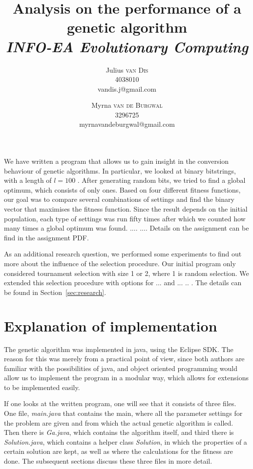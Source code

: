 \documentclass[10pt,a4paper,onecolumn]{article}
\title{Analysis on the performance of a genetic algorithm\\ \textit{INFO-EA Evolutionary Computing}}
\author{Julius \textsc{van Dis} \\ 4038010 \\vandis.j@gmail.com
\and Myrna \textsc{van de Burgwal} \\ 3296725 \\myrnavandeburgwal@gmail.com}
\begin{document}
\maketitle
\thispagestyle{empty}
%
\section*{}
We have written a program that allows us to gain insight in the conversion behaviour of genetic algorithms. In particular, we looked at binary bitstrings, with a length of $l=100$ . After generating random bits, we tried to find a global optimum, which consists of only ones. Based on four different fitness functions, our goal was to compare several combinations of settings and find the binary vector that maximises the fitness function. Since the result depends on the initial population, each type of settings was run fifty times after which we counted how many times a global optimum was found.
....
....
Details on the assignment can be find in the assignment PDF.

As an additional research question, we performed some experiments to find out more about the influence of the selection procedure. Our initial program only considered tournament selection with size 1 or 2, where 1 is random selection. We extended this selection procedure with options for ... and  ... .. . The details can be found in Section~\ref{sec:research}.

\section{Explanation of implementation}
The genetic algorithm was implemented in java, using the Eclipse SDK. The reason for this was merely from a practical point of view, since both authors are familiar with the possibilities of java, and object oriented programming would allow us to implement the program in a modular way, which allows for extensions to be implemented easily.

If one looks at the written program, one will see that it consists of three files. One file, \textit{main.java} that contains the main, where all the parameter settings for the problem are given and from which the actual genetic algorithm is called. Then there is \textit{Ga.java}, which contains the algorithm itself, and third there is \textit{Solution.java}, which contains a helper class \textit{Solution}, in which the properties of a certain solution are kept, as well as where the calculations for the fitness are done. The subsequent sections discuss these three files in more detail.
\end{document}
